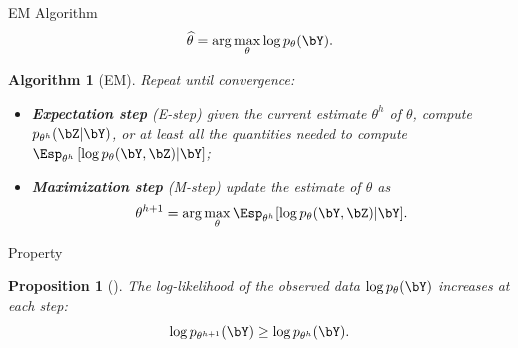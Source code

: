 \documentclass[compress,10pt]{beamer}
\newtheorem{proposition}{Proposition}
\newtheorem{algorithm}{Algorithm}
\begin{document}
\begin{frame}{EM Algorithm}
$$
\widehat{\theta} = \arg\max_\theta \log p_\theta(\bY).
$$
\label{Algo:EM}

\begin{algorithm}[EM] 
 Repeat until convergence:
  \begin{itemize}
   \item[] \textbf{\color{dgreen}Expectation step} (E-step) given the current estimate $\theta^h$ of $\theta$, compute $p_{\theta^h}(\bZ|\bY)$, or at least all the quantities needed to compute $\Esp_{\theta^h}\left[\log p_\theta(\bY, \bZ) | \bY\right]$;
   \item[]\textbf{\color{dgreen}Maximization step} (M-step) update the estimate of $\theta$ as
   $$
   \theta^{h+1} = \arg\max_\theta \Esp_{\theta^h}[\log p_\theta(\bY, \bZ) |\bY].
   $$
  \end{itemize}
\end{algorithm}
\end{frame}

\begin{frame}{Property}

\begin{proposition}[\cite{Dempster77}] 
The log-likelihood of the observed data $\log p_\theta(\bY)$ increases at each step: 
$$
\log p_{\theta^{h+1}}(\bY) \geq \log p_{\theta^h}(\bY).
$$
\end{proposition}
\end{frame}
\end{document}
